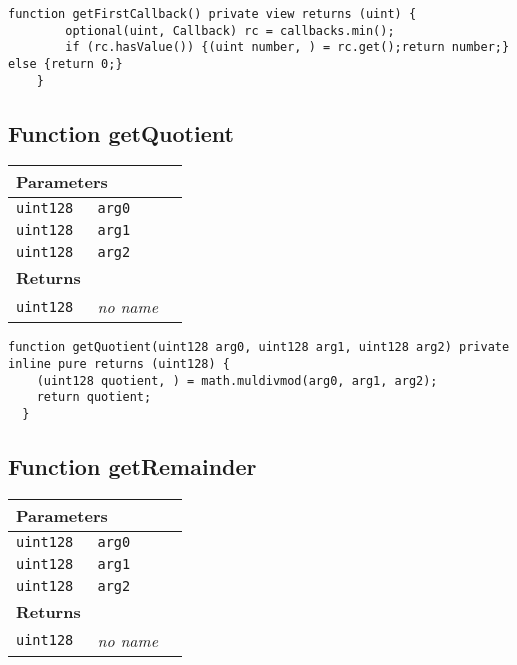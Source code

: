 \vspace{2cm}

\begin{lstlisting}[firstnumber=121]
  function getFirstCallback() private view returns (uint) {
		optional(uint, Callback) rc = callbacks.min();
		if (rc.hasValue()) {(uint number, ) = rc.get();return number;} else {return 0;}
	}
\end{lstlisting}

\subsection{Function getQuotient}


\ifsoltables
\noindent\begin{tabular}{|l|l|p{5cm}|}\hline
\multicolumn{3}{|l|}{\bf Parameters}\\\hline
\tt uint128 & \tt arg0 &\\\hline
\tt uint128 & \tt arg1 &\\\hline
\tt uint128 & \tt arg2 &\\\hline
\multicolumn{3}{|l|}{\bf Returns}\\\hline
\tt uint128 & {\em no name} &\\\hline
\end{tabular}
\fi

\vspace{2cm}

\begin{lstlisting}[firstnumber=109]
  function getQuotient(uint128 arg0, uint128 arg1, uint128 arg2) private inline pure returns (uint128) {
    (uint128 quotient, ) = math.muldivmod(arg0, arg1, arg2);
    return quotient;
  }
\end{lstlisting}

\subsection{Function getRemainder}


\ifsoltables
\noindent\begin{tabular}{|l|l|p{5cm}|}\hline
\multicolumn{3}{|l|}{\bf Parameters}\\\hline
\tt uint128 & \tt arg0 &\\\hline
\tt uint128 & \tt arg1 &\\\hline
\tt uint128 & \tt arg2 &\\\hline
\multicolumn{3}{|l|}{\bf Returns}\\\hline
\tt uint128 & {\em no name} &\\\hline
\end{tabular}
\fi

